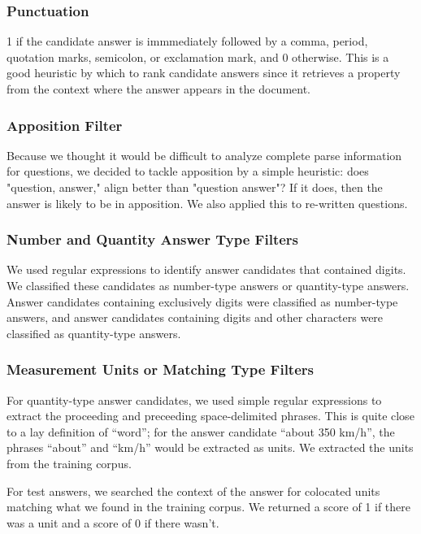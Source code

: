 \documentclass{article}
\begin{document}
\subsubsection{Punctuation}

1 if the candidate answer is immmediately followed by a comma, period, quotation
marks, semicolon, or exclamation mark, and 0 otherwise. This is a good heuristic
by which to rank candidate answers since it retrieves a property from the
context where the answer appears in the document.

\subsubsection{Apposition Filter}

Because we thought it would be difficult to analyze complete parse information
for questions, we decided to tackle apposition by a simple heuristic:  does
"question, answer," align better than "question answer"?  If it does, then the
answer is likely to be in apposition.  We also applied this to re-written
questions.

\subsubsection{Number and Quantity Answer Type Filters}
We used regular expressions to identify answer candidates that contained digits.
We classified these candidates as number-type answers or quantity-type answers.
Answer candidates containing exclusively digits were classified as number-type
answers, and answer candidates containing digits and other characters were
classified as quantity-type answers.

\subsubsection{Measurement Units or Matching Type Filters}
For quantity-type answer candidates, we used simple regular expressions to
extract the proceeding and preceeding space-delimited phrases. This is quite
close to a lay definition of ``word''; for the answer candidate ``about 350
km/h'', the phrases ``about'' and ``km/h'' would be extracted as units. We
extracted the units from the training corpus.

For test answers, we searched the context of the answer for colocated units
matching what we found in the training corpus. We returned a score of 1 if there
was a unit and a score of 0 if there wasn't.
\end{document}
